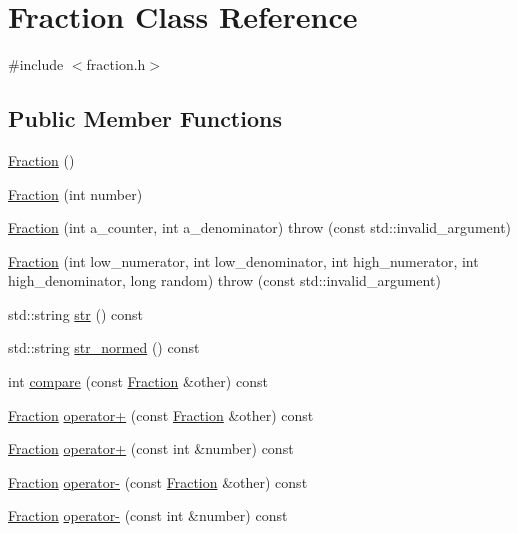 \hypertarget{classFraction}{\section{Fraction Class Reference}
\label{classFraction}
}


{\ttfamily \#include $<$fraction.\-h$>$}

\subsection*{Public Member Functions}
\begin{DoxyCompactItemize}
\item 
\hyperlink{classFraction_a29efaf0ef03cceab0bfa637e9eea2b7b}{Fraction} ()
\item 
\hyperlink{classFraction_a6e610a7144e0532f65c6ee45ef55727b}{Fraction} (int number)
\item 
\hyperlink{classFraction_a22f64669ffc85d2a58b9d27ae7d6a325}{Fraction} (int a\-\_\-counter, int a\-\_\-denominator)  throw (const std\-::invalid\-\_\-argument)
\item 
\hyperlink{classFraction_ab00b79044cca6774873bdaae713442b9}{Fraction} (int low\-\_\-numerator, int low\-\_\-denominator, int high\-\_\-numerator, int high\-\_\-denominator, long random)  throw (const std\-::invalid\-\_\-argument)
\item 
std\-::string \hyperlink{classFraction_acce62ee78d404b21f2f1d479cd829d3d}{str} () const 
\item 
std\-::string \hyperlink{classFraction_a7381f62ce532529cb447f4edf8f6dbd4}{str\-\_\-normed} () const 
\item 
int \hyperlink{classFraction_a80ad92f94192095396d0722028f050ca}{compare} (const \hyperlink{classFraction}{Fraction} \&other) const 
\item 
\hyperlink{classFraction}{Fraction} \hyperlink{classFraction_ad896accd57d849ed98ee6d72881fcb9d}{operator+} (const \hyperlink{classFraction}{Fraction} \&other) const 
\item 
\hyperlink{classFraction}{Fraction} \hyperlink{classFraction_ad02a7202d1cbc6260a09f9548d061ceb}{operator+} (const int \&number) const 
\item 
\hyperlink{classFraction}{Fraction} \hyperlink{classFraction_a889369a41355240f4f62654d5df52641}{operator-\/} (const \hyperlink{classFraction}{Fraction} \&other) const 
\item 
\hyperlink{classFraction}{Fraction} \hyperlink{classFraction_aac873ae172a2da47085a475322c41905}{operator-\/} (const int \&number) const 

\end{DoxyCompactItemize}
